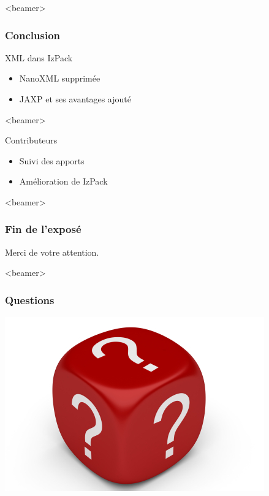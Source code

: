 \begin{frame}<beamer>
\frametitle{Conclusion}
\begin{beamerboxesrounded}[shadow=true]{XML dans IzPack}
\begin{itemize}
	\item NanoXML supprimée
	\item JAXP et ses avantages ajouté
\end{itemize}
\end{beamerboxesrounded}
\end{frame}
\begin{frame}<beamer>
\begin{beamerboxesrounded}[shadow=true]{Contributeurs}
\begin{itemize}
	\item Suivi des apports
	\item Amélioration de IzPack
\end{itemize}
\end{beamerboxesrounded}
\end{frame}
\begin{frame}<beamer>\frametitle{Fin de l'exposé}
\begin{center}
Merci de votre attention.
\end{center}
\end{frame}
\begin{frame}<beamer>\frametitle{Questions}
\begin{center}
\includegraphics[width=.6\linewidth]{../image/questionMark.jpg}
\end{center}
\end{frame}
